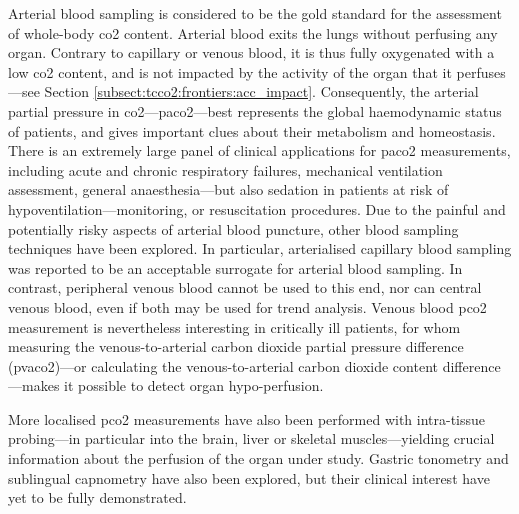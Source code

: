 Arterial blood sampling is considered to be the gold standard for the assessment of whole-body \gls{co2} content. Arterial blood exits the lungs without perfusing any organ. Contrary to capillary or venous blood, it is thus fully oxygenated with a low \gls{co2} content, and is not impacted by the activity of the organ that it perfuses\cite{kowalchuk1988, diaztagle2017}---see Section \ref{subsect:tcco2:frontiers:acc_impact}. Consequently, the arterial partial pressure in \gls{co2}---\gls{paco2}---best represents the global haemodynamic status of patients, and gives important clues about their metabolism and homeostasis\cite{larkin2015, wagner2015}. There is an extremely large panel of clinical applications for \gls{paco2} measurements, including acute and chronic respiratory failures\cite{foster1988, cukic2014}, mechanical ventilation assessment\cite{nava1994, tsuboi2010}, general anaesthesia---but also sedation in patients at risk of hypoventilation---monitoring\cite{campbell1994}, or resuscitation procedures\cite{schneider2013}. Due to the painful and potentially risky aspects of arterial blood puncture\cite{scheer2002}, other blood sampling techniques have been explored. In particular, arterialised capillary blood sampling was reported to be an acceptable surrogate for arterial blood sampling\cite{zavorsky2007}. In contrast, peripheral venous blood cannot be used to this end\cite{byrne2014}, nor can central venous blood\cite{malinoski2005, treger2010, walkey2010}, even if both may be used for trend analysis. Venous blood \gls{pco2} measurement is nevertheless interesting in critically ill patients, for whom measuring the venous-to-arterial carbon dioxide partial pressure difference (\gls{pvaco2})---or calculating the venous-to-arterial carbon dioxide content difference---makes it possible to detect organ hypo-perfusion\cite{scheeren2018}.


More localised \gls{pco2} measurements have also been performed with intra-tissue probing---in particular into the brain\cite{charbel2000}, liver\cite{brooks2007} or skeletal muscles\cite{mckinley1999}---yielding crucial information about the perfusion of the organ under study. Gastric tonometry and sublingual capnometry have also been explored, but their clinical interest have yet to be fully demonstrated\cite{mythen2015, mallat2018}.



